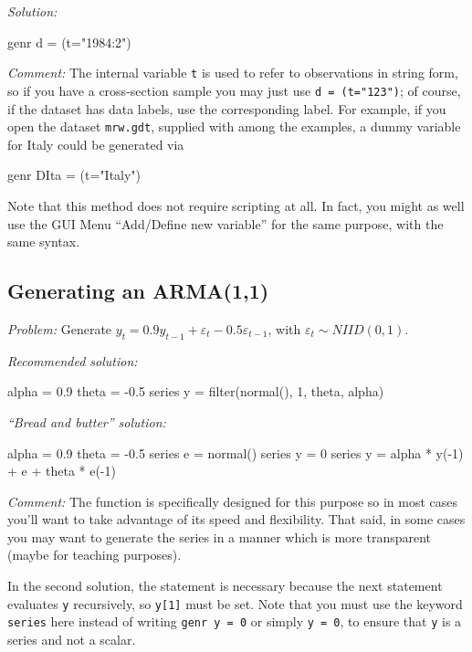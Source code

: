 \emph{Solution:}
\begin{code}
  genr d = (t="1984:2")
\end{code}

\emph{Comment:} The internal variable \texttt{t} is used to refer to
observations in string form, so if you have a cross-section sample you
may just use \texttt{d = (t="123")}; of course, if the dataset has
data labels, use the corresponding label. For example, if you open the
dataset \texttt{mrw.gdt}, supplied with  among the
examples, a dummy variable for Italy could be generated via
\begin{code}
  genr DIta = (t="Italy")
\end{code}

Note that this method does not require scripting at all. In fact, you
might as well use the GUI Menu ``Add/Define new variable'' for the
same purpose, with the same syntax.

\subsection{Generating an ARMA(1,1)}

\emph{Problem:} Generate $y_t = 0.9 y_{t-1} + \varepsilon_t - 0.5
\varepsilon_{t-1}$, with $\varepsilon_t \sim N\!I\!I\!D(0,1)$.

\emph{Recommended solution:}
\begin{code}
alpha = 0.9
theta = -0.5
series y = filter(normal(), {1, theta}, alpha)
\end{code}

\emph{``Bread and butter'' solution:}
\begin{code}
alpha = 0.9
theta = -0.5
series e = normal()
series y = 0
series y = alpha * y(-1) + e + theta * e(-1)
\end{code}

\emph{Comment:} The  function is specifically designed for
this purpose so in most cases you'll want to take advantage of its
speed and flexibility. That said, in some cases you may want to
generate the series in a manner which is more transparent (maybe for
teaching purposes). 

In the second solution, the statement  is necessary
because the next statement evaluates \texttt{y} recursively, so
\texttt{y[1]} must be set.  Note that you must use the keyword
\texttt{series} here instead of writing \texttt{genr y = 0} or simply
\texttt{y = 0}, to ensure that \texttt{y} is a series and
not a scalar.


